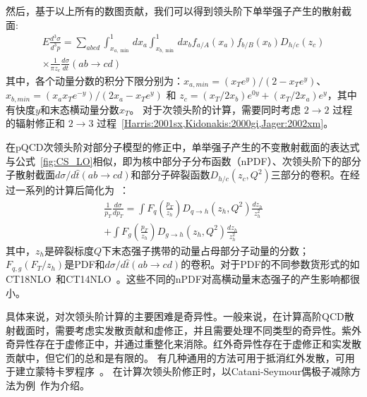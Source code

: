 然后，基于以上所有的数图贡献，我们可以得到领头阶下单举强子产生的散射截面:
\begin{equation}
	\begin{array}{r}
		E \frac{d^3 \sigma}{d^3 p}=\sum_{a b c d} \int_{x_{a, \min }}^1 d x_a \int_{x_{b, \min }}^1 d x_b f_{a / A}\left(x_a\right) f_{b / B}\left(x_b\right) D_{h / c}\left(z_c\right) \\
		\times \frac{1}{\pi z_c} \frac{d \sigma}{d t}(a b \rightarrow c d)
	\end{array}
	\label{eq:CS_LO}
\end{equation}
其中，各个动量分数的积分下限分别为：$x_{a,min}=(x_T e^y)/(2- x_T e^y)$、$x_{b,min}=(x_a x_T e^{-y})/(2x_a - x_T e^y)$ 和 $z_c = (x_T/2x_b)e^{0y} + (x_T/2x_a)e^y$，其中有快度$y$和末态横动量分数$x_T$。
对于次领头阶的计算，需要同时考虑 $2\to 2$ 过程的辐射修正和 $2\to 3$ 过程~\ref{Harris:2001sx,Kidonakis:2000gi,Jager:2002xm}。

	在pQCD次领头阶对部分子模型的修正中，单举强子产生的不变散射截面的表达式与公式~\ref{fig:CS_LO}相似，即为核中部分子分布函数（nPDF）、次领头阶下的部分子散射截面$d\sigma / d \hat{t} (ab \to cd)$和部分子碎裂函数$D_{h/c}(z_c,Q^2)$三部分的卷积。在经过一系列的计算后简化为~\parencite{Kidonakis:2000gi}：
\begin{equation}
	\begin{array}{r}
		\frac{1}{p_T} \frac{d \sigma}{d p_T}= \int F_q (\frac{p_T}{z_h}) D_{q \to h} (z_h, Q^2) \frac{dz_h}{z_h^2} \\
		+ \int F_g (\frac{p_T}{z_h}) D_{g \to h} (z_h, Q^2) \frac{dz_h}{z_h^2}
	\end{array}
	\label{eq:CS_parton}
\end{equation}
其中，$z_h$是碎裂标度$Q$下末态强子携带的动量占母部分子动量的分数；$F_{q,g}(F_T/z_h)$是PDF和$d\sigma / d \hat{t} (ab \to cd)$的卷积。对于PDF的不同参数货形式的如CT18NLO~\parencite{Hou:2019efy}和CT14NLO~\parencite{Hou:2016sho,Dulat:2015mca}。这些不同的nPDF对高横动量末态强子的产生影响都很小。


%
具体来说，对次领头阶计算的主要困难是奇异性。一般来说，在计算高阶QCD散射截面时，需要考虑实发散贡献和虚修正，并且需要处理不同类型的奇异性。紫外奇异性存在于虚修正中，并通过重整化来消除。红外奇异性存在于虚修正和实发散贡献中，但它们的总和是有限的。
有几种通用的方法可用于抵消红外发散，可用于建立蒙特卡罗程序~\parencite{Nagy:1996bz,}。
在计算次领头阶修正时，以Catani-Seymour偶极子减除方法为例~\parencite{Catani:1996vz}作为介绍。

